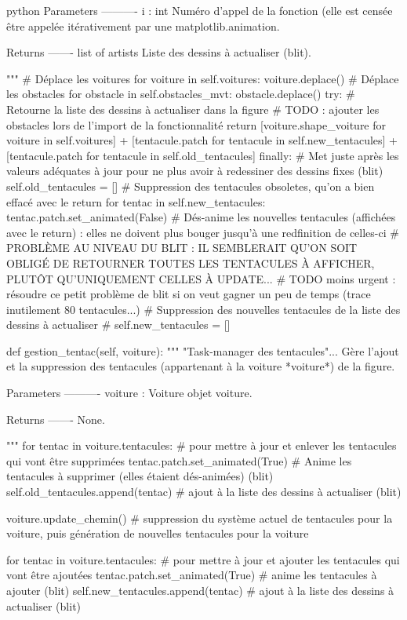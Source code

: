 \begin{mintedbox}{python}
        Parameters
        ----------
        i : int
            Numéro d'appel de la fonction (elle est censée être appelée itérativement par une matplotlib.animation.

        Returns
        -------
        list of artists
            Liste des dessins à actualiser (blit).

        """
        # Déplace les voitures
        for voiture in self.voitures:
            voiture.deplace()
        # Déplace les obstacles
        for obstacle in self.obstacles_mvt:
            obstacle.deplace()
        try:
            # Retourne la liste des dessins à actualiser dans la figure
            # TODO : ajouter les obstacles lors de l'import de la fonctionnalité
            return [voiture.shape_voiture for voiture in self.voitures] + [tentacule.patch for tentacule in self.new_tentacules] + [tentacule.patch for tentacule in self.old_tentacules]
        finally:
            # Met juste après les valeurs adéquates à jour pour ne plus avoir à redessiner des dessins fixes (blit)
            self.old_tentacules = []  # Suppression des tentacules obsoletes, qu'on a bien effacé avec le return
            for tentac in self.new_tentacules:
                tentac.patch.set_animated(False)  # Dés-anime les nouvelles tentacules (affichées avec le return) : elles ne doivent plus bouger jusqu'à une redfinition de celles-ci
            # PROBLÈME AU NIVEAU DU BLIT : IL SEMBLERAIT QU'ON SOIT OBLIGÉ DE RETOURNER TOUTES LES TENTACULES À AFFICHER, PLUTÔT QU'UNIQUEMENT CELLES À UPDATE...
            # TODO moins urgent : résoudre ce petit problème de blit si on veut gagner un peu de temps (trace inutilement 80 tentacules...)
            # Suppression des nouvelles tentacules de la liste des dessins à actualiser
            # self.new_tentacules = []

    def gestion_tentac(self, voiture):
        """
        "Task-manager des tentacules"... Gère l'ajout et la suppression des tentacules (appartenant à la voiture *voiture*) de la figure.

        Parameters
        ----------
        voiture : Voiture
            objet voiture.

        Returns
        -------
        None.

        """
        for tentac in voiture.tentacules:  # pour mettre à jour et enlever les tentacules qui vont être supprimées
            tentac.patch.set_animated(True)  # Anime les tentacules à supprimer (elles étaient dés-animées) (blit)
            self.old_tentacules.append(tentac)  # ajout à la liste des dessins à actualiser (blit)

        voiture.update_chemin()  # suppression du système actuel de tentacules pour la voiture, puis génération de nouvelles tentacules pour la voiture

        for tentac in voiture.tentacules:  # pour mettre à jour et ajouter les tentacules qui vont être ajoutées
            tentac.patch.set_animated(True)  # anime les tentacules à ajouter (blit)
            self.new_tentacules.append(tentac)  # ajout à la liste des dessins à actualiser (blit)

\end{mintedbox}
